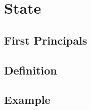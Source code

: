 \section{State}
\subsection{First Principals}
\begin{frame}

\end{frame}
\subsection{Definition}
\begin{frame}

\end{frame}
\subsection{Example}
\begin{frame}

\end{frame}
